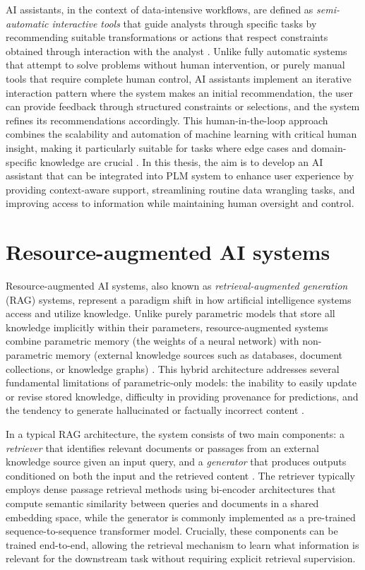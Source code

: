 AI assistants, in the context of data-intensive workflows, are defined as \textit{semi-automatic interactive tools} that guide analysts through specific tasks by recommending suitable transformations or actions that respect constraints obtained through interaction with the analyst \parencite{petricek_ai_2023}. Unlike fully automatic systems that attempt to solve problems without human intervention, or purely manual tools that require complete human control, AI assistants implement an iterative interaction pattern where the system makes an initial recommendation, the user can provide feedback through structured constraints or selections, and the system refines its recommendations accordingly. This human-in-the-loop approach combines the scalability and automation of machine learning with critical human insight, making it particularly suitable for tasks where edge cases and domain-specific knowledge are crucial \parencite{petricek_ai_2023}. In this thesis, the aim is to develop an AI assistant that can be integrated into PLM system to enhance user experience by providing context-aware support, streamlining routine data wrangling tasks, and improving access to information while maintaining human oversight and control.

\section{Resource-augmented AI systems}
\label{sec:resource-augmented-ai-systems}

Resource-augmented AI systems, also known as \emph{retrieval-augmented generation} (RAG) systems, represent a paradigm shift in how artificial intelligence systems access and utilize knowledge. Unlike purely parametric models that store all knowledge implicitly within their parameters, resource-augmented systems combine parametric memory (the weights of a neural network) with non-parametric memory (external knowledge sources such as databases, document collections, or knowledge graphs) \parencite{lewis_retrieval-augmented_2021}. This hybrid architecture addresses several fundamental limitations of parametric-only models: the inability to easily update or revise stored knowledge, difficulty in providing provenance for predictions, and the tendency to generate hallucinated or factually incorrect content \parencite{lewis_retrieval-augmented_2021}.

In a typical RAG architecture, the system consists of two main components: a \emph{retriever} that identifies relevant documents or passages from an external knowledge source given an input query, and a \emph{generator} that produces outputs conditioned on both the input and the retrieved content \parencite{lewis_retrieval-augmented_2021}. The retriever typically employs dense passage retrieval methods using bi-encoder architectures that compute semantic similarity between queries and documents in a shared embedding space, while the generator is commonly implemented as a pre-trained sequence-to-sequence transformer model. Crucially, these components can be trained end-to-end, allowing the retrieval mechanism to learn what information is relevant for the downstream task without requiring explicit retrieval supervision.

